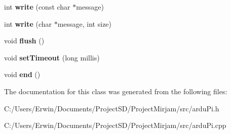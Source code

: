 \begin{DoxyCompactItemize}
\item 
\hypertarget{class_serial_pi_a6418cab2b472be7c69754937a45dfd8b}{}int {\bfseries write} (const char $\ast$message)\label{class_serial_pi_a6418cab2b472be7c69754937a45dfd8b}

\item 
\hypertarget{class_serial_pi_aac9e5875ecb297da8a37f80430b2aaed}{}int {\bfseries write} (char $\ast$message, int size)\label{class_serial_pi_aac9e5875ecb297da8a37f80430b2aaed}

\item 
\hypertarget{class_serial_pi_a81d24e8d8f6ac8010171a87e7807b618}{}void {\bfseries flush} ()\label{class_serial_pi_a81d24e8d8f6ac8010171a87e7807b618}

\item 
\hypertarget{class_serial_pi_a05ff66817a299691df92c9b9cb7f1c20}{}void {\bfseries set\+Timeout} (long millis)\label{class_serial_pi_a05ff66817a299691df92c9b9cb7f1c20}

\item 
\hypertarget{class_serial_pi_a032717a822c95184793b6e01d26ccc56}{}void {\bfseries end} ()\label{class_serial_pi_a032717a822c95184793b6e01d26ccc56}

\end{DoxyCompactItemize}


The documentation for this class was generated from the following files\+:\begin{DoxyCompactItemize}
\item 
C\+:/\+Users/\+Erwin/\+Documents/\+Project\+S\+D/\+Project\+Mirjam/src/ardu\+Pi.\+h\item 
C\+:/\+Users/\+Erwin/\+Documents/\+Project\+S\+D/\+Project\+Mirjam/src/ardu\+Pi.\+cpp\end{DoxyCompactItemize}
